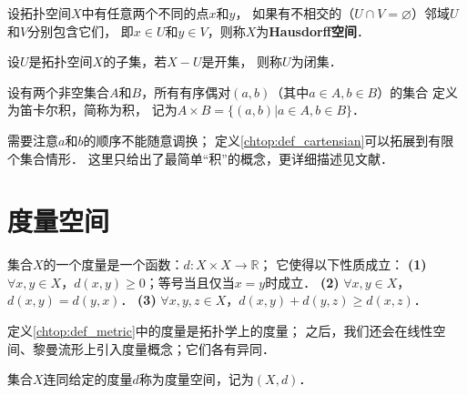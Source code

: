 \begin{definition}\label{chtop:def_Hausdorff}
    设拓扑空间$X$中有任意两个不同的点$x$和$y$，
    如果有不相交的（$U \cap V = \varnothing$）邻域$U$和$V$分别包含它们，
    即$x\in U$和$y\in V$，则称$X$为{\bfseries \heiti Hausdorff空间}．
     
\end{definition}





\begin{definition}\label{chtop:def_closedset}
    设$U$是拓扑空间$X$的子集，若$X-U$是开集，
    则称$U$为{\heiti 闭集}． 
\end{definition}


\begin{definition}\label{chtop:def_cartensian}
    设有两个非空集合$A$和$B$，所有有序偶对$(a,b)$（其中$a\in A, b\in B$）的集合
    定义为{\heiti 笛卡尔积}，简称为{\heiti 积}，
    记为$A \times B = \{(a,b)| a\in A, b\in B \}$．
\end{definition}
需要注意$a$和$b$的顺序不能随意调换；
定义\ref{chtop:def_cartensian}可以拓展到有限个集合情形．
这里只给出了最简单“积”的概念，更详细描述见文献\parencite[\S 1, \S5, \S 15, \S19]{munkres-2000-topology}．




\section{度量空间}
\begin{definition}\label{chtop:def_metric}
    集合$X$的一个{\heiti 度量}是一个函数：$d:X\times X \to \mathbb{R}$；
    它使得以下性质成立：
    {\bfseries (1)} $\forall x,y \in X$，$d(x,y) \geqslant 0$；等号当且仅当$x=y$时成立．
    {\bfseries (2)} $\forall x,y \in X$，$d(x,y) =d(y,x)$．
    {\bfseries (3)} $\forall x,y,z \in X$，$d(x,y) +d(y,z) \geqslant d(x,z)$．
\end{definition}


定义\ref{chtop:def_metric}中的度量是拓扑学上的度量；
之后，我们还会在线性空间、黎曼流形上引入度量概念；它们各有异同．

\begin{definition}
    集合$X$连同给定的度量$d$称为{\heiti 度量空间}，记为$(X,d)$．
\end{definition}


